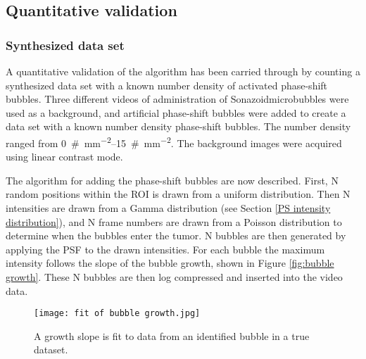 \subsection{Quantitative validation}
\subsubsection{Synthesized data set}
A quantitative validation of the algorithm has been carried through by counting a synthesized data set with a known number density of activated phase-shift bubbles. Three different videos of administration of Sonazoid\texttrademark microbubbles were used as a background, and artificial phase-shift bubbles were added to create a data set with a known number density phase-shift bubbles. The number density ranged from \SIrange[per-mode=symbol]{0}{15}{\#\per\milli\meter\squared}. The background images were acquired using linear contrast mode.


The algorithm for adding the phase-shift bubbles are now described. First, N random positions within the ROI is drawn from a uniform distribution. Then N intensities are drawn from a Gamma distribution (see Section \ref{PS intensity distribution}), and N frame numbers are drawn from a Poisson distribution to determine when the bubbles enter the tumor. N bubbles are then generated by applying the PSF to the drawn intensities. For each bubble the maximum intensity follows the slope of the bubble growth, shown in Figure \ref{fig:bubble growth}. These N bubbles are then log compressed and inserted into the video data. 


\begin{figure}[h]
  \centering
  \label{Fig:growth slope}
  \texttt{[image: fit of bubble growth.jpg]}
  \caption{A growth slope is fit to data from an identified bubble in a true dataset.}
\end{figure}


